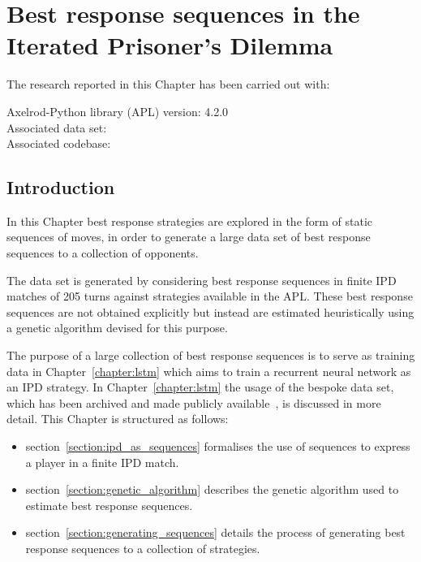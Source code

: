 \chapter{Best response sequences in the Iterated Prisoner's Dilemma}\label{chapter:best_response_sequence}

\begin{center}
    The research reported in this Chapter has been carried out with:

    Axelrod-Python library (APL) version: 4.2.0 \\
    Associated data set: \cite{Glynatsi2020_sequences} \\
    Associated codebase: \cite{Glynatsi_2020_sensei} \\ \vspace{.5cm}
\end{center}

\hrulefill

\section{Introduction}

In this Chapter best response strategies are explored in the form
of static sequences of moves, in order to generate a large data set of best
response sequences to a collection of opponents.

The data set is generated by considering best response sequences in finite IPD
matches of 205 turns against \numberofstrategiesbestsequences strategies
available in the APL. These best response sequences are not obtained explicitly
but instead are estimated heuristically using a genetic algorithm devised for
this purpose.

The purpose of a large collection of best response sequences is
to serve as training data in Chapter~\ref{chapter:lstm} which aims to train a
recurrent neural network as an IPD strategy. In Chapter~\ref{chapter:lstm} the
usage of the bespoke data set, which has been archived and made publicly
available~\cite{Glynatsi2020_sequences}, is discussed in more detail. This
Chapter is structured as follows:

\begin{itemize}
    \item section~\ref{section:ipd_as_sequences} formalises the use of sequences to express a player in a
    finite IPD match.
    \item section~\ref{section:genetic_algorithm} describes the genetic algorithm
    used to estimate best response
    sequences.
    \item section~\ref{section:generating_sequences} details the process of
    generating best response sequences to a collection of
    \numberofstrategiesbestsequences strategies.
\end{itemize}

